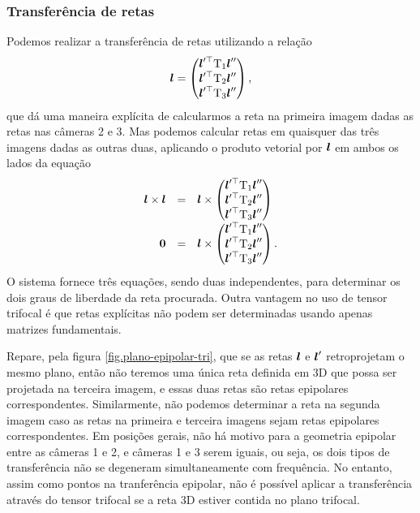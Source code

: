 \subsubsection{Transferência de retas}
Podemos realizar a transferência de retas utilizando a relação
\begin{equation*}
\boldsymbol{l}=
\begin{pmatrix}
\boldsymbol{l}'^\top \mbox{T}_1\boldsymbol{l}''\\
\boldsymbol{l}'^\top \mbox{T}_2\boldsymbol{l}''\\
\boldsymbol{l}'^\top \mbox{T}_3\boldsymbol{l}''
\end{pmatrix},
\end{equation*}
que dá uma maneira explícita de calcularmos a reta na primeira imagem dadas as retas nas câmeras 2 e 3. Mas podemos calcular retas em quaisquer das três imagens dadas as outras duas, aplicando o produto vetorial por $\boldsymbol{l}$ em ambos os lados da equação
\begin{equation*}
\begin{array}{rcl}
\boldsymbol{l}\times\boldsymbol{l}&=&\boldsymbol{l}\times
\begin{pmatrix}
\boldsymbol{l}'^\top \mbox{T}_1\boldsymbol{l}''\\
\boldsymbol{l}'^\top \mbox{T}_2\boldsymbol{l}''\\
\boldsymbol{l}'^\top \mbox{T}_3\boldsymbol{l}''
\end{pmatrix}\\
{\bf 0}&=&\boldsymbol{l}\times
\begin{pmatrix}
\boldsymbol{l}'^\top \mbox{T}_1\boldsymbol{l}''\\
\boldsymbol{l}'^\top \mbox{T}_2\boldsymbol{l}''\\
\boldsymbol{l}'^\top \mbox{T}_3\boldsymbol{l}''
\end{pmatrix}.\\
\end{array}
\end{equation*}
O sistema fornece três equações, sendo duas independentes, para determinar os dois graus de liberdade da reta procurada. Outra vantagem no uso de tensor trifocal é que retas explícitas não podem ser determinadas usando apenas matrizes fundamentais.

Repare, pela figura \ref{fig.plano-epipolar-tri}, que se as retas $\boldsymbol{l}$ e $\boldsymbol{l}'$ retroprojetam o mesmo plano, então não teremos uma única reta definida em 3D que possa ser projetada na terceira imagem, e essas duas retas são retas epipolares correspondentes. Similarmente, não podemos determinar a reta na segunda imagem caso as retas na primeira e terceira imagens sejam retas epipolares correspondentes. Em posições gerais, não há motivo para a geometria epipolar entre as câmeras 1 e 2, e câmeras 1 e 3 serem iguais, ou seja, os dois tipos de transferência não se degeneram simultaneamente com frequência. No entanto, assim como pontos na tranferência epipolar, não é possível aplicar a transferência através do tensor trifocal se a reta 3D estiver contida no plano trifocal. 

